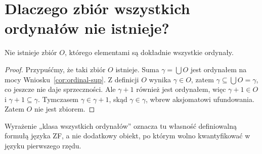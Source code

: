 \section{Dlaczego zbiór wszystkich ordynałów nie istnieje?}
\begin{twierdzenie}\label{thm:burali-forti}
Nie istnieje zbiór $O$, którego elementami są dokładnie wszystkie ordynały.
\end{twierdzenie}
\begin{proof}
Przypuśćmy, że taki zbiór $O$ istnieje. Suma $\gamma=\bigcup O$ jest ordynałem na mocy Wniosku~\ref{cor:ordinal-sup}. Z definicji $O$ wynika $\gamma\in O$, zatem $\gamma\subseteq\bigcup O=\gamma$, co jeszcze nie daje sprzeczności. Ale $\gamma+1$ również jest ordynałem, więc $\gamma+1\in O$ i $\gamma+1\subseteq\gamma$. Tymczasem $\gamma\in\gamma+1$, skąd $\gamma\in\gamma$, wbrew aksjomatowi ufundowania. Zatem $O$ nie jest zbiorem.
\end{proof}
\begin{uwaga}
Wyrażenie „klasa wszystkich ordynałów” oznacza tu własność definiowalną formułą języka ZF, a nie dodatkowy obiekt, po którym wolno kwantyfikować w języku pierwszego rzędu.
\end{uwaga}
